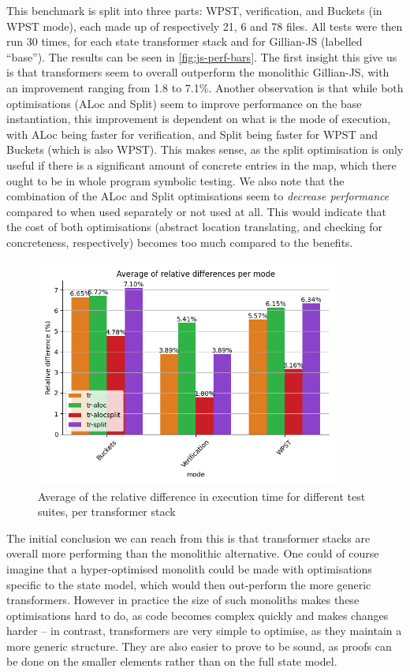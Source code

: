 This benchmark is split into three parts: WPST, verification, and Buckets (in WPST mode), each made up of respectively 21, 6 and 78 files. All tests were then run 30 times, for each state transformer stack and for Gillian-JS (labelled ``base''). The results can be seen in \autoref{fig:js-perf-bars}. The first insight this give us is that transformers seem to overall outperform the monolithic Gillian-JS, with an improvement ranging from 1.8 to 7.1\%. Another observation is that while both optimisations (ALoc and Split) seem to improve performance on the base instantiation, this improvement is dependent on what is the mode of execution, with ALoc being faster for verification, and Split being faster for WPST and Buckets (which is also WPST). This makes sense, as the split optimisation is only useful if there is a significant amount of concrete entries in the map, which there ought to be in whole program symbolic testing. We also note that the combination of the ALoc and Split optimisations seem to \emph{decrease performance} compared to when used separately or not used at all. This would indicate that the cost of both optimisations (abstract location translating, and checking for concreteness, respectively) becomes too much compared to the benefits.

\begin{figure}
	\centering
	\includegraphics[width=10cm]{figures/js-perf-bars.png}
	\caption{Average of the relative difference in execution time for different test suites, per transformer stack}
	\label{fig:js-perf-bars}
\end{figure}

The initial conclusion we can reach from this is that transformer stacks are overall more performing than the monolithic alternative. One could of course imagine that a hyper-optimised monolith could be made with optimisations specific to the state model, which would then out-perform the more generic transformers. However in practice the size of such monoliths makes these optimisations hard to do, as code becomes complex quickly and makes changes harder -- in contrast, transformers are very simple to optimise, as they maintain a more generic structure. They are also easier to prove to be sound, as proofs can be done on the smaller elements rather than on the full state model.

